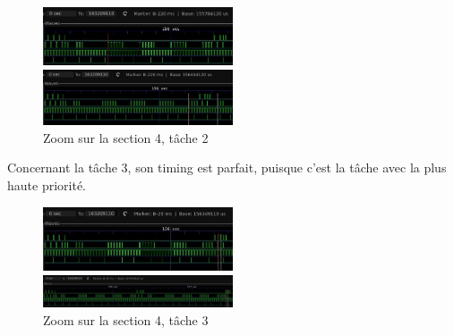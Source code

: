 \documentclass[11pt, a4paper]{article}
\begin{document}
\begin{figure}[H]
    \begin{multicols}{2}
        \begin{center}
            \includegraphics[width=0.5\textwidth]{section4_send_t2_cmd_1}
        \end{center}
        \columnbreak
        \begin{center}
            \includegraphics[width=0.5\textwidth]{section4_send_t2_cmd_2}
        \end{center}
    \end{multicols}
    \caption{Zoom sur la section 4, tâche 2}
    \label{Zoom sur la section 4, tâche 2}
\end{figure}

Concernant la tâche 3, son timing est parfait, puisque c'est la tâche avec la plus haute priorité.

\begin{figure}[H]
    \begin{multicols}{2}
        \begin{center}
            \includegraphics[width=0.5\textwidth]{section4_send_t3_load_1}
        \end{center}
        \columnbreak
        \begin{center}
            \includegraphics[width=0.5\textwidth]{section4_send_t3_load_2}
        \end{center}
    \end{multicols}
    \caption{Zoom sur la section 4, tâche 3}
    \label{Zoom sur la section 4, tâche 3}
\end{figure}
\end{document}

